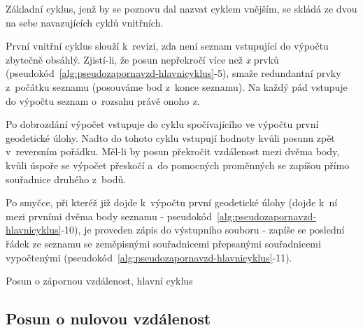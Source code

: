 Základní cyklus, jenž by se poznovu dal nazvat cyklem vnějším, se skládá ze dvou na sebe
navazujících cyklů vnitřních. 

První vnitřní cyklus slouží k~revizi, zda není seznam vstupující do výpočtu zbytečně obsáhlý.
Zjistí-li, že posun nepřekročí více než \textit{x} prvků
(pseudokód~\ref{alg:pseudozapornavzd-hlavnicyklus}-5), smaže redundantní prvky z~počátku seznamu (posouváme bod
z~konce seznamu). Na každý pád vstupuje do výpočtu seznam o~rozsahu právě onoho \textit{x}. 

Po dobrozdání výpočet vstupuje do cyklu spočívajícího ve výpočtu první geode\-tické úlohy.
Nadto do tohoto cyklu vstupují hodnoty kvůli posunu zpět v~reversním pořádku. Měl-li by
posun překročit vzdálenost mezi dvěma body, kvůli úspoře se výpočet přeskočí a~do pomocných
proměnných se zapíšou přímo souřadnice druhého z~bodů. 

Po smyčce, při kteréž již dojde k~výpočtu první geodetické úlohy
(dojde k~ní mezi prvními dvěma body seznamu - pseudokód~\ref{alg:pseudozapornavzd-hlavnicyklus}-10),
je proveden zápis do výstupního souboru - zapíše se poslední řádek ze seznamu se
zeměpisnými souřadnicemi přepsanými souřadnicemi vypočtenými (pseudokód~\ref{alg:pseudozapornavzd-hlavnicyklus}-11). 

\begin{algorithm}
\caption{Posun o zápornou vzdálenost, hlavní cyklus}
    \label{alg:pseudozapornavzd-hlavnicyklus}
    \begin{algorithmic}[1]
    \ENDIF
    \ENDFOR
    \ENDWHILE
    \end{algorithmic}
\end{algorithm}

\subsection{Posun o nulovou vzdálenost}
\label{nulovavzdalenost}

